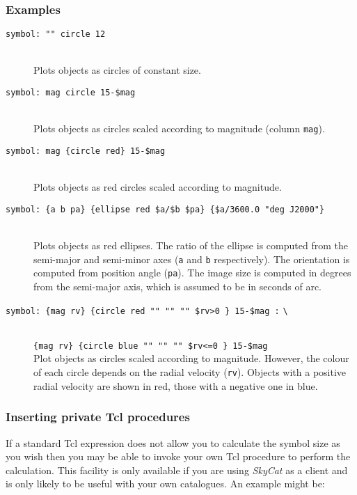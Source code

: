 \documentclass[twoside,11pt,nolof,chapters]{starlink}
\begin{document}
\subsubsection{Examples}

\begin{description}

  \item[\texttt{symbol: "" circle 12}] ~ \\
   Plots objects as circles of constant size.

  \item[\texttt{symbol: mag circle 15-\$mag}] ~ \\
   Plots objects as circles scaled according to magnitude (column \texttt{mag}).

  \item[\texttt{symbol: mag \{circle red\} 15-\$mag}] ~ \\
   Plots objects as red circles scaled according to magnitude.

  \item[\texttt{symbol: \{a b pa\} \{ellipse red \$a/\$b \$pa\}
   \{\$a/3600.0 "deg J2000"\} }] ~ \\
   Plots objects as red ellipses.  The ratio of the ellipse is computed
   from the semi-major and semi-minor axes (\texttt{a} and \texttt{b}
   respectively).  The orientation is computed from position angle (\texttt{pa}).  The image size is computed in degrees from the semi-major axis,
   which is assumed to be in seconds of arc.

  \item[\texttt{symbol: \{mag rv\} \{circle red "" "" "" \$rv>0 \} 15-\$mag :}
   \texttt{\textbackslash}] ~ \\
   \texttt{\{mag rv\} \{circle blue "" "" "" \$rv<=0 \} 15-\$mag} \\
   Plot objects as circles scaled according to magnitude.  However,
   the colour of each circle depends on the radial velocity (\texttt{rv}).
   Objects with a positive radial velocity are shown in red, those with
   a negative one in blue.

\end{description}

\subsubsection{Inserting private Tcl procedures}

If a standard Tcl expression does not allow you to calculate the symbol
size as you wish then you may be able to invoke your own Tcl procedure
to perform the calculation.  This facility is only available if you are
using \textit{SkyCat}\/ as a client and is only likely to be useful with
your own catalogues.  An example might be:
\end{document}
